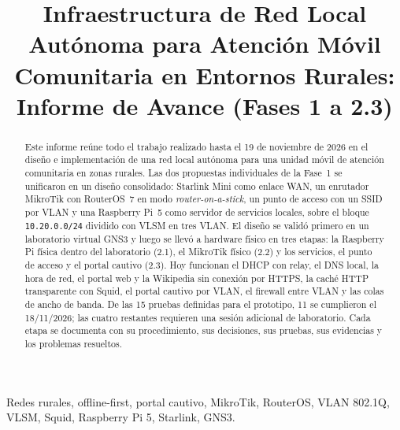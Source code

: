 \documentclass[conference]{IEEEtran}
\begin{document}
\title{Infraestructura de Red Local Autónoma para Atención Móvil Comunitaria en Entornos Rurales: Informe de Avance (Fases 1 a 2.3)}

\author{
}

\maketitle

\begin{abstract}
Este informe reúne todo el trabajo realizado hasta el 19 de noviembre de 2026 en el diseño e implementación de una red local autónoma para una unidad móvil de atención comunitaria en zonas rurales. Las dos propuestas individuales de la Fase~1 se unificaron en un diseño consolidado: Starlink Mini como enlace WAN, un enrutador MikroTik con RouterOS~7 en modo \textit{router-on-a-stick}, un punto de acceso con un SSID por VLAN y una Raspberry Pi~5 como servidor de servicios locales, sobre el bloque \texttt{10.20.0.0/24} dividido con VLSM en tres VLAN. El diseño se validó primero en un laboratorio virtual GNS3 y luego se llevó a hardware físico en tres etapas: la Raspberry Pi física dentro del laboratorio (2.1), el MikroTik físico (2.2) y los servicios, el punto de acceso y el portal cautivo (2.3). Hoy funcionan el DHCP con relay, el DNS local, la hora de red, el portal web y la Wikipedia sin conexión por HTTPS, la caché HTTP transparente con Squid, el portal cautivo por VLAN, el firewall entre VLAN y las colas de ancho de banda. De las 15 pruebas definidas para el prototipo, 11 se cumplieron el 18/11/2026; las cuatro restantes requieren una sesión adicional de laboratorio. Cada etapa se documenta con su procedimiento, sus decisiones, sus pruebas, sus evidencias y los problemas resueltos.
\end{abstract}

\begin{IEEEkeywords}
Redes rurales, offline-first, portal cautivo, MikroTik, RouterOS, VLAN 802.1Q, VLSM, Squid, Raspberry Pi 5, Starlink, GNS3.
\end{IEEEkeywords}
\end{document}
